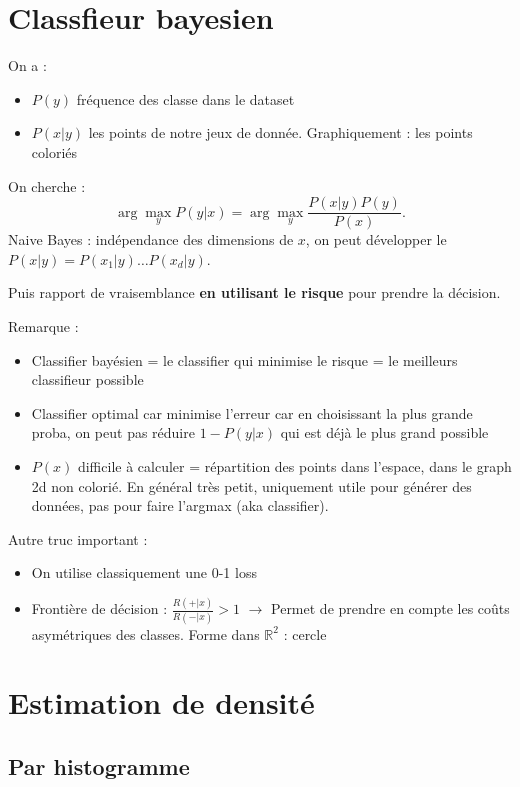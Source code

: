 \documentclass{article}
\begin{document}
\section{Classfieur bayesien}
On a : 
\begin{itemize}
    \item $ P(y) $ fréquence des classe dans le dataset
    \item $ P(x|y) $ les points de notre jeux de donnée. Graphiquement : les points coloriés
\end{itemize}
On cherche : 
\[
    \arg \max _y P(y|x) = \arg \max _y \frac{P(x|y) P(y)}{P(x)}
.\]
Naive Bayes : indépendance des dimensions de $ x $, on peut développer le $ P(x|y) = P(x_1|y) \dots P(x_d|y) $.

Puis rapport de vraisemblance \textbf{en utilisant le risque} pour prendre la décision.

Remarque : 
\begin{itemize}
    \item Classifier bayésien = le classifier qui minimise le risque = le meilleurs classifieur possible
    \item Classifier optimal car minimise l'erreur car en choisissant la plus grande proba, on peut pas réduire $ 1 - P(y | x) $ qui est déjà le plus grand possible  
    \item $ P(x) $ difficile à calculer = répartition des points dans l'espace, dans le graph 2d non colorié. En général très petit, uniquement utile pour générer des données, pas pour faire l'argmax (aka classifier).
\end{itemize}
Autre truc important : 
\begin{itemize}
    \item On utilise classiquement une 0-1 loss
    \item Frontière de décision : $ \frac{R(+|x)}{R(-|x)} > 1 $  $\rightarrow$ Permet de prendre en compte les coûts asymétriques des classes. Forme dans $ \mathbb{R}^2 $ : cercle
\end{itemize}

\section{Estimation de densité}
\subsection{Par histogramme}
\end{document}
